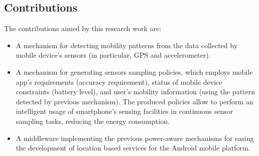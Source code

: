 \documentclass[ENG,PhD]{cinvestav}
\begin{document}
\subsection{Contributions}
The contributions aimed by this research work are:
\begin{itemize}
  \item A mechanism for detecting mobility patterns from the data collected by mobile device's sensors (in particular, GPS and accelerometer).
  \item A mechanism for generating sensors sampling policies, which employs mobile app's requirements (accuracy requirement), status of mobile device constraints (battery level), and user's mobility information (using the pattern detected by previous mechanism).
  The produced policies allow to perform an intelligent usage of smartphone's sensing facilities in continuous sensor sampling tasks, reducing the energy consumption.
  \item A middleware implementing the previous power-aware mechanisms for easing the development of location based services for the Android mobile platform.
\end{itemize}
\end{document}
